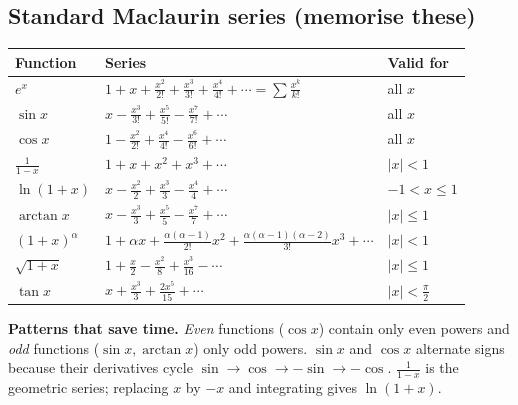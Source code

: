 \documentclass[11pt,a4paper]{article}
\renewcommand{\arraystretch}{1.25}
\begin{document}
\subsection{Standard Maclaurin series (memorise these)}
\begin{center}
\small
\renewcommand{\arraystretch}{1.7}
\begin{tabularx}{\textwidth}{>{\raggedright\arraybackslash}p{2.1cm}>{\raggedright\arraybackslash}X>{\raggedright\arraybackslash}p{2.2cm}}
\toprule
\textbf{Function} & \textbf{Series} & \textbf{Valid for}\\
\midrule
$e^x$ & $1+x+\frac{x^2}{2!}+\frac{x^3}{3!}+\frac{x^4}{4!}+\cdots=\sum\frac{x^k}{k!}$ & all $x$\\
$\sin x$ & $x-\frac{x^3}{3!}+\frac{x^5}{5!}-\frac{x^7}{7!}+\cdots$ & all $x$\\
$\cos x$ & $1-\frac{x^2}{2!}+\frac{x^4}{4!}-\frac{x^6}{6!}+\cdots$ & all $x$\\
$\frac1{1-x}$ & $1+x+x^2+x^3+\cdots$ & $|x|<1$\\
$\ln(1+x)$ & $x-\frac{x^2}{2}+\frac{x^3}{3}-\frac{x^4}{4}+\cdots$ & $-1<x\le1$\\
$\arctan x$ & $x-\frac{x^3}{3}+\frac{x^5}{5}-\frac{x^7}{7}+\cdots$ & $|x|\le1$\\
$(1+x)^\alpha$ & $1+\alpha x+\frac{\alpha(\alpha-1)}{2!}x^2+\frac{\alpha(\alpha-1)(\alpha-2)}{3!}x^3+\cdots$ & $|x|<1$\\
$\sqrt{1+x}$ & $1+\frac x2-\frac{x^2}{8}+\frac{x^3}{16}-\cdots$ & $|x|\le1$\\
$\tan x$ & $x+\frac{x^3}{3}+\frac{2x^5}{15}+\cdots$ & $|x|<\frac\pi2$\\
\bottomrule
\end{tabularx}
\end{center}

\begin{intuition}
\textbf{Patterns that save time.} \emph{Even} functions ($\cos x$) contain only even powers and \emph{odd} functions ($\sin x,\arctan x$) only odd powers. $\sin x$ and $\cos x$ alternate signs because their derivatives cycle $\sin\to\cos\to-\sin\to-\cos$. $\frac1{1-x}$ is the geometric series; replacing $x$ by $-x$ and integrating gives $\ln(1+x)$.
\end{intuition}
\end{document}
